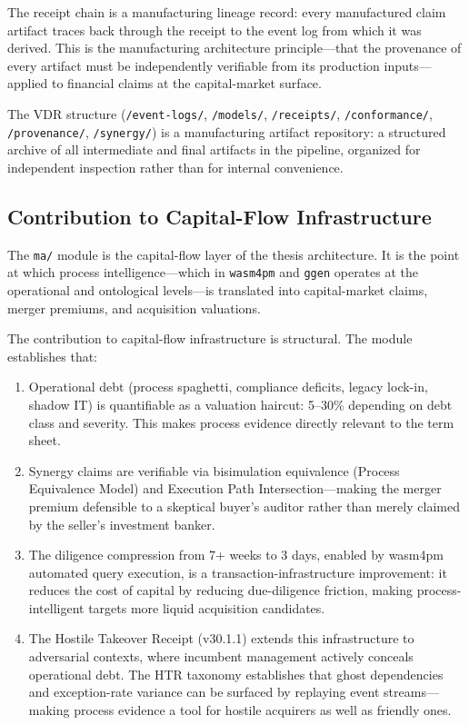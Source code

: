 The receipt chain is a manufacturing lineage record: every manufactured claim artifact traces
back through the receipt to the event log from which it was derived. This is the
manufacturing architecture principle---that the provenance of every artifact must be
independently verifiable from its production inputs---applied to financial claims at the
capital-market surface.

The VDR structure (\texttt{/event-logs/}, \texttt{/models/}, \texttt{/receipts/},
\texttt{/conformance/}, \texttt{/provenance/}, \texttt{/synergy/}) is a manufacturing
artifact repository: a structured archive of all intermediate and final artifacts in the
pipeline, organized for independent inspection rather than for internal convenience.

\subsection{Contribution to Capital-Flow Infrastructure}
\label{sec:ma-contrib-capital-flow}

The \texttt{ma/} module is the capital-flow layer of the thesis architecture. It is the point
at which process intelligence---which in \texttt{wasm4pm} and \texttt{ggen} operates at the
operational and ontological levels---is translated into capital-market claims, merger
premiums, and acquisition valuations.

The contribution to capital-flow infrastructure is structural. The module establishes that:

\begin{enumerate}
  \item Operational debt (process spaghetti, compliance deficits, legacy lock-in, shadow IT)
    is quantifiable as a valuation haircut: 5--30\% depending on debt class and severity. This
    makes process evidence directly relevant to the term sheet.
  \item Synergy claims are verifiable via bisimulation equivalence (Process Equivalence Model)
    and Execution Path Intersection---making the merger premium defensible to a skeptical
    buyer's auditor rather than merely claimed by the seller's investment banker.
  \item The diligence compression from 7+ weeks to 3 days, enabled by wasm4pm automated
    query execution, is a transaction-infrastructure improvement: it reduces the cost of
    capital by reducing due-diligence friction, making process-intelligent targets more
    liquid acquisition candidates.
  \item The Hostile Takeover Receipt (v30.1.1) extends this infrastructure to adversarial
    contexts, where incumbent management actively conceals operational debt. The HTR taxonomy
    establishes that ghost dependencies and exception-rate variance can be surfaced by
    replaying event streams---making process evidence a tool for hostile acquirers as well
    as friendly ones.
\end{enumerate}

